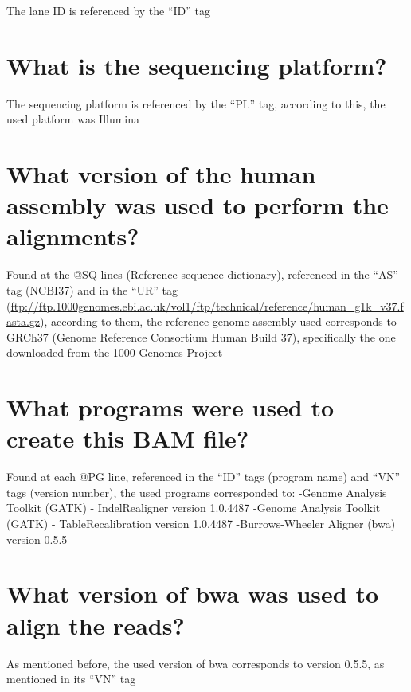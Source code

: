 \documentclass[
]{article}
\begin{document}
The lane ID is referenced by the ``ID'' tag

\hypertarget{what-is-the-sequencing-platform}{%
\section{What is the sequencing
platform?}\label{what-is-the-sequencing-platform}}

The sequencing platform is referenced by the ``PL'' tag, according to
this, the used platform was Illumina

\hypertarget{what-version-of-the-human-assembly-was-used-to-perform-the-alignments}{%
\section{What version of the human assembly was used to perform the
alignments?}\label{what-version-of-the-human-assembly-was-used-to-perform-the-alignments}}

Found at the @SQ lines (Reference sequence dictionary), referenced in
the ``AS'' tag (NCBI37) and in the ``UR'' tag
(\url{ftp://ftp.1000genomes.ebi.ac.uk/vol1/ftp/technical/reference/human_g1k_v37.fasta.gz}),
according to them, the reference genome assembly used corresponds to
GRCh37 (Genome Reference Consortium Human Build 37), specifically the
one downloaded from the 1000 Genomes Project

\hypertarget{what-programs-were-used-to-create-this-bam-file}{%
\section{What programs were used to create this BAM
file?}\label{what-programs-were-used-to-create-this-bam-file}}

Found at each @PG line, referenced in the ``ID'' tags (program name) and
``VN'' tags (version number), the used programs corresponded to: -Genome
Analysis Toolkit (GATK) - IndelRealigner version 1.0.4487 -Genome
Analysis Toolkit (GATK) - TableRecalibration version 1.0.4487
-Burrows-Wheeler Aligner (bwa) version 0.5.5

\hypertarget{what-version-of-bwa-was-used-to-align-the-reads}{%
\section{What version of bwa was used to align the
reads?}\label{what-version-of-bwa-was-used-to-align-the-reads}}

As mentioned before, the used version of bwa corresponds to version
0.5.5, as mentioned in its ``VN'' tag
\end{document}
